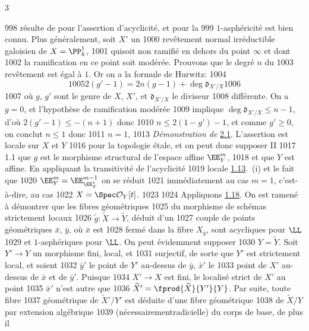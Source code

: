 3	\documentclass[10pt]{../fichiers-configuration-latex/smfart}
\begin{document}
   998	résulte de  pour l'assertion d'acyclicité, et pour la
   999	$1$-asphéricité est bien connu. Plus généralement, soit $X'$ un
  1000	revêtement normal irréductible galoisien de $X=\PP^{1}_k$,
  1001	qui\pageoriginale soit non ramifié en dehors du point $\infty$ et dont
  1002	la ramification en ce point soit modérée. Prouvons que le degré $n$ du
  1003	revêtement est égal à $1$. Or on a la formule de Hurwitz:
  1004	$$
  1005	2(g'-1)=2n(g-1)+\deg \mathfrak{d}_{X'/X}
  1006	$$
  1007	où $g$, $g'$ sont le genre de $X$, $X'$, et $\mathfrak{d}_{X'/X}$ le diviseur
  1008	différente. On a $g=0$, et l'hypothèse de ramification modérée
  1009	implique $\deg \mathfrak{d}_{X'/X}\leq n-1$, d'où $2(g'-1)\leq -(n+1)$ donc
  1010	$n\leq 2(1-g')-1$, et comme $g'\geq 0$, on conclut $n\leq 1$ donc
  1011	$n=1$, 	
  1013			\emph{Démonstration de} \hyperref[XV.thm2.1]{2.1}. L'assertion est locale sur $X$ et $Y$
  1016	pour la topologie étale, et on peut donc supposer \sisi{(}{} II
  1017	1.1\sisi{)}{} que $g$ est le morphisme structural de l'espace affine $\EE^m_Y$,
  1018	et que $Y$ est affine. En appliquant la transitivité de l'acyclicité
  1019	locale \hyperref[XV.prop1.13]{1.13}.~(i) et le fait que
  1020	$\EE^m_Y=\EE^{m-1}_{\EE^1_Y}$ on se réduit
  1021	immédiatement au cas $m=1$, c'est-à-dire, au cas
  1022	$X=\Spec \mathcal{O}_Y[t]$. %
  1023	
  1024	Appliquons \hyperref[XV.cor1.18]{1.18}. On est ramené à démontrer que les fibres géométriques
  1025	du morphisme de schémas strictement locaux
  1026	$\widetilde{g}:\widetilde{X}\rightarrow \widetilde{Y}$, déduit d'un
  1027	couple de points géométriques $\bar{x}$, $\bar{y}$, où $\bar{x}$ est
  1028	fermé dans la fibre $X_{\bar{y}}$, sont acycliques pour $\LL$
  1029	et $1$-asphériques pour $\LL$. On peut évidemment supposer
  1030	$Y=\widetilde{Y}$. Soit $Y'\rightarrow Y$ un morphisme fini, local, et
  1031	surjectif, de sorte que $Y'$ est strictement local, et soient
  1032	$\bar{y}'$ le point de $Y'$ au-dessus de $\bar{y}$, $\bar{x}'$ le
  1033	point de $X'$ au-dessus de $\bar{x}$ et de $\bar{y}'$. Puisque
  1034	$X'\rightarrow X$ est fini, le localisé strict de $X'$ au point
  1035	$\bar{x}'$ n'est autre que
  1036	$\widetilde{X}'=\fprod{\widetilde{X}}{Y'}{Y}$. Par suite, toute fibre
  1037	géométrique de $\widetilde{X}'/Y'$ est déduite d'une fibre géométrique
  1038	de $\widetilde{X}/Y$ par extension algébrique
  1039	(nécessairement\pageoriginale radicielle) du corps de base, de plus il
\end{document}

